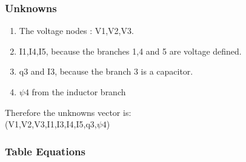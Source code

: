 \subsubsection{Unknowns}
\begin{enumerate}
\item The voltage nodes : V1,V2,V3.
\item I1,I4,I5, because the branches 1,4 and 5 are voltage defined.
\item q3 and I3, because the branch 3 is a capacitor.
\item $\psi 4$ from the inductor branch
\end{enumerate}
Therefore the unknowns vector is:\\
(V1,V2,V3,I1,I3,I4,I5,q3,$\psi 4$)
\subsubsection{Table Equations}
